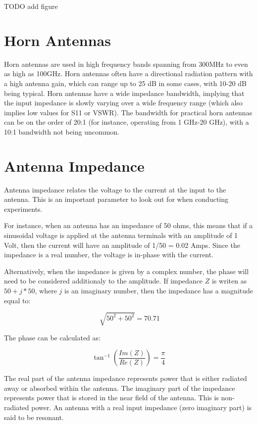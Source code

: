 \documentclass[a4paper,11pt]{jsarticle}
\begin{document}
TODO add figure

\section{Horn Antennas}

Horn antennas are used in high frequency bands spanning from 300MHz
to even as high as 100GHz.
Horn antennas often have a directional radiation pattern with a high antenna gain,
which can range up to 25 dB in some cases, with 10-20 dB being typical.
Horn antennas have a wide impedance bandwidth,
implying that the input impedance is slowly varying over a wide frequency range (which also implies low values for S11 or VSWR). The bandwidth for practical horn antennas can be on the order of 20:1 (for instance, operating from 1 GHz-20 GHz),
with a 10:1 bandwidth not being uncommon.

\section{Antenna Impedance}


Antenna impedance relates the voltage to the current at the input to the antenna.
This is an important parameter to look out for when conducting experiments.

For instance, when an antenna has an impedance of 50 ohms,
this means that if a sinusoidal voltage is applied at the antenna terminals with an amplitude of 1 Volt,
then the current will have an amplitude of 1/50 = 0.02 Amps.
Since the impedance is a real number, the voltage is in-phase with the current.

Alternatively, when the impedance is given by a complex number,
the phase will need to be considered additionaly to the amplitude.
If impedance $Z$ is writen as $50 + j*50$, where $j$ is an imaginary number,
then the impedance has a magnitude equal to:

\begin{equation}
  \sqrt[]{50^2 + 50 ^2} = 70.71
\end{equation}

The phase can be calculated as:

\begin{equation}
  \tan^{-1}(\frac{Im(Z)}{Re(Z)}) = \frac{\pi}{4}
\end{equation}

The real part of the antenna impedance represents power that is either radiated away or absorbed within the antenna.
The imaginary part of the impedance represents power
that is stored in the near field of the antenna.
This is non-radiated power.
An antenna with a real input impedance (zero imaginary part)
is said to be resonant.
\end{document}
